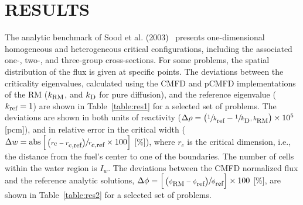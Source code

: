 \documentclass[letterpaper]{mc2021}
\newcommand{\kref}{\ensuremath{k_{\textrm{\scriptsize{ref}}}}}
\newcommand{\kd}{\ensuremath{k_{\textrm{\scriptsize{D}}}}}
\newcommand{\krm}{\ensuremath{k_{\textrm{\scriptsize{RM}}}}}
\newcommand{\rcref}{\ensuremath{r_{\textrm{\scriptsize{c,ref}}}}}
\newcommand{\rc}{\ensuremath{r_{\textrm{\scriptsize{c}}}}}
\newcommand{\phiref}{\ensuremath{\phi_{\textrm{\scriptsize{ref}}}}}
\newcommand{\phirm}{\ensuremath{\phi_{\textrm{\scriptsize{RM}}}}}
\begin{document}
\vspace{-6.5mm}
%

\section{RESULTS}

The analytic benchmark of Sood et al. (2003)~\cite{Sood2003} presents one-dimensional homogeneous and heterogeneous critical configurations, including the associated one-, two-, and three-group cross-sections. For some problems, the spatial distribution of the flux is given at specific points. 
%
The deviations between the criticality eigenvalues, calculated using the CMFD and pCMFD implementations of the RM ($\krm$, and $\kd$ for pure diffusion), and the reference eigenvalue ($\kref=1$) are shown in Table~\ref{table:res1} for a selected set of problems. The deviations are shown in both units of reactivity ($\Delta\rho = \left(\sfrac{1}{\kref}- \sfrac{1}{\kd,\krm}\right)\times 10^5$ [pcm]), and in relative error in the critical width ($\Delta w = \text{abs}\left[ \sfrac{ \left( \rc-\rcref\right)}{\rcref}\times 100\right]$ [\%]), where $r_c$ is the critical dimension, i.e., the distance from the fuel's center to one of the boundaries. The number of cells within the water region is $I_w$.
%
The deviations between the CMFD normalized flux and the reference analytic solutions,  $\Delta\phi = \left[\sfrac{\left(\phirm - \phiref\right)}{\phiref}\right]\times 100$ [\%], are shown in Table~\ref{table:res2} for a selected set of problems. 
%
\end{document}
